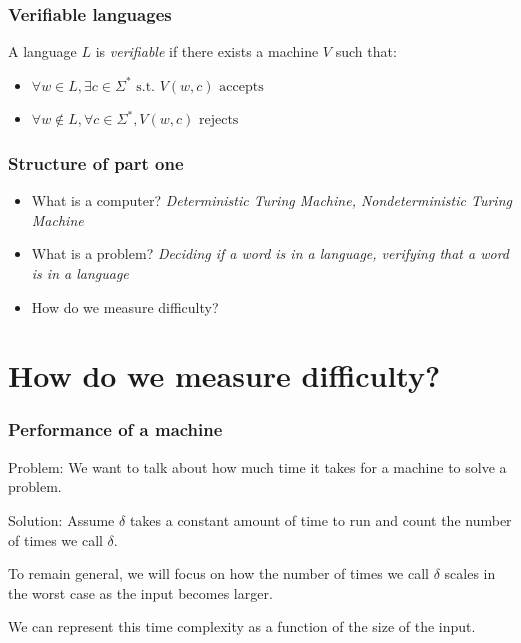 \documentclass[aspectratio=169]{beamer}
\begin{document}
\begin{frame}
\frametitle{Verifiable languages}
A language $L$ is {\em verifiable} if there exists a machine $V$ such that:

\begin{itemize}
    \item $\forall w \in L, \exists c \in \Sigma^* \text{ s.t. } V(w, c) \text{ accepts}$
    \item $\forall w \notin L, \forall c \in \Sigma^*, V(w, c) \text{ rejects }$
\end{itemize}
\end{frame}

\begin{frame}
\frametitle{Structure of part one}
\begin{itemize}
    \item What is a computer? {\em Deterministic Turing Machine, Nondeterministic Turing Machine}
    \item What is a problem? {\em Deciding if a word is in a language, verifying that a word is in a language}
    \item How do we measure difficulty?
\end{itemize}
\end{frame}

\section{How do we measure difficulty?}

\begin{frame}
\frametitle{Performance of a machine}
Problem: We want to talk about how much time it takes for a machine to solve a problem.

Solution: Assume $\delta$ takes a constant amount of time to run and count the number of times we call $\delta$.

To remain general, we will focus on how the number of times we call $\delta$ scales in the worst case as the input becomes larger.

We can represent this time complexity as a function of the size of the input.
\end{frame}
\end{document}
